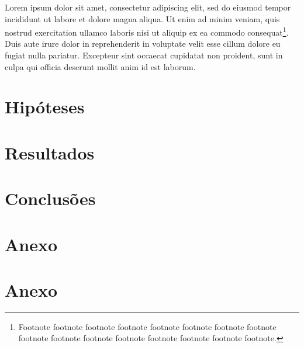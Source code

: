 \documentclass[Portugues]{ic-tese-v3}
\begin{document}
Lorem ipsum dolor sit amet, consectetur adipiscing elit, sed do eiusmod
tempor incididunt ut labore et dolore magna aliqua. Ut enim ad minim
veniam, quis nostrud exercitation ullamco laboris nisi ut aliquip ex ea
commodo consequat\footnote{Footnote footnote footnote footnote footnote
  footnote footnote footnote footnote footnote footnote footnote footnote
  footnote footnote footnote.}.  Duis aute irure dolor in reprehenderit in
voluptate velit esse cillum dolore eu fugiat nulla pariatur. Excepteur sint
occaecat cupidatat non proident, sunt in culpa qui officia deserunt mollit
anim id est laborum.

\chapter{Hipóteses}

\chapter{Resultados}

\chapter{Conclusões}





\appendix
\chapter{Anexo}
\chapter{Anexo}
\end{document}
